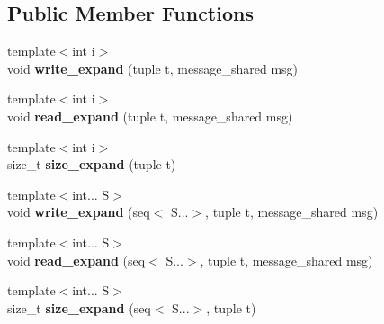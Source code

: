 \subsection*{\-Public \-Member \-Functions}
\begin{DoxyCompactItemize}
\item 
\hypertarget{classgal_1_1network_1_1vector__ext_a939f4207902372496e63b9928b399129}{{\footnotesize template$<$int i$>$ }\\void {\bfseries write\-\_\-expand} (tuple t, message\-\_\-shared msg)}\label{classgal_1_1network_1_1vector__ext_a939f4207902372496e63b9928b399129}

\item 
\hypertarget{classgal_1_1network_1_1vector__ext_a7536e046bfdfcc2546929f0cbb899d5f}{{\footnotesize template$<$int i$>$ }\\void {\bfseries read\-\_\-expand} (tuple t, message\-\_\-shared msg)}\label{classgal_1_1network_1_1vector__ext_a7536e046bfdfcc2546929f0cbb899d5f}

\item 
\hypertarget{classgal_1_1network_1_1vector__ext_afdb06e31b1925621ae74abefdeffbfbf}{{\footnotesize template$<$int i$>$ }\\size\-\_\-t {\bfseries size\-\_\-expand} (tuple t)}\label{classgal_1_1network_1_1vector__ext_afdb06e31b1925621ae74abefdeffbfbf}

\item 
\hypertarget{classgal_1_1network_1_1vector__ext_a5d5973d02bea3a06c8967d8322d468fd}{{\footnotesize template$<$int... \-S$>$ }\\void {\bfseries write\-\_\-expand} (seq$<$ \-S...$>$, tuple t, message\-\_\-shared msg)}\label{classgal_1_1network_1_1vector__ext_a5d5973d02bea3a06c8967d8322d468fd}

\item 
\hypertarget{classgal_1_1network_1_1vector__ext_a8c931a009f25967b60c08e22db9156e4}{{\footnotesize template$<$int... \-S$>$ }\\void {\bfseries read\-\_\-expand} (seq$<$ \-S...$>$, tuple t, message\-\_\-shared msg)}\label{classgal_1_1network_1_1vector__ext_a8c931a009f25967b60c08e22db9156e4}

\item 
\hypertarget{classgal_1_1network_1_1vector__ext_a82e2e595a33e267c78a32d1e54516933}{{\footnotesize template$<$int... \-S$>$ }\\size\-\_\-t {\bfseries size\-\_\-expand} (seq$<$ \-S...$>$, tuple t)}\label{classgal_1_1network_1_1vector__ext_a82e2e595a33e267c78a32d1e54516933}


\end{DoxyCompactItemize}
